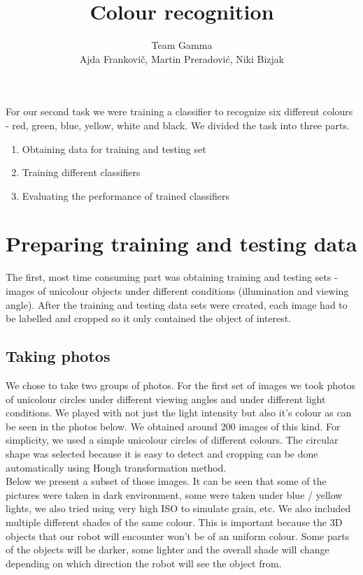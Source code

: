 \documentclass[12pt,a4paper]{article}
\author{Team Gamma \\ {\small Ajda Frankovič, Martin Preradović, Niki Bizjak}}
\title{Colour recognition}
\date{}
\begin{document}
	
	\maketitle
	
	For our second task we were training a classifier to recognize six different colours - red, green, blue, yellow, white and black. We divided the task into three parts. 

	\begin{enumerate}
		\item Obtaining data for training and testing set
		\item Training different classifiers
		\item Evaluating the performance of trained classifiers
	\end{enumerate}
		
	\section{Preparing training and testing data}

	The first, most time consuming part was obtaining training and testing sets - images of unicolour objects under different conditions (illumination and viewing angle). After the training and testing data sets were created, each image had to be labelled and cropped so it only contained the object of interest. \\

	\subsection{Taking photos}
	
	We chose to take two groups of photos. For the first set of images we took photos of unicolour circles under different viewing angles and under different light conditions. We played with not just the light intensity but also it's colour as can be seen in the photos below. We obtained around 200 images of this kind. For simplicity, we used a simple unicolour circles of different colours. The circular shape was selected because it is easy to detect and cropping can be done automatically using Hough transformation method. \\
	
	Below we present a subset of those images. It can be seen that some of the pictures were taken in dark environment, some were taken under blue / yellow lights, we also tried using very high ISO to simulate grain, etc. We also included multiple different shades of the same colour. This is important because the 3D objects that our robot will encounter won't be of an uniform colour. Some parts of the objects will be darker, some lighter and the overall shade will change depending on which direction the robot will see the object from.
\end{document}
